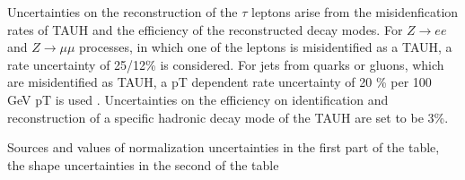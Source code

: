 Uncertainties on the reconstruction of the $\tau$ leptons arise from the misidenfication rates of \gls{TAUH} and the efficiency of the reconstructed decay modes. For $Z\to ee$ and $Z\to \mu\mu$ processes, in which one of the leptons is misidentified as a \gls{TAUH}, a rate uncertainty of 25/12\% is considered. For jets from quarks or gluons, which are misidentified as \gls{TAUH}, a \gls{pT} dependent rate uncertainty of 20 \% per 100 GeV \gls{pT} is used \cite{TAURECO}. Uncertainties on the efficiency on identification and reconstruction of a specific hadronic decay mode of the \gls{TAUH} are set to be 3\%.


\begin{table}[hbtp]
	\centering
	\caption[Systematic uncertainties]{Sources and values of normalization uncertainties in the first part of the table, the shape uncertainties in the second of the table}
	

\end{table}
